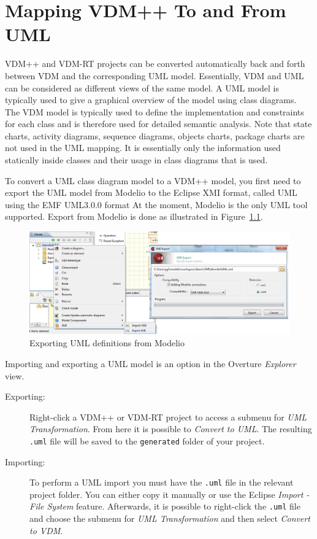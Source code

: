 \documentclass{overturerepchap}
\begin{document}
\chapter{Mapping VDM++ To and From UML}\label{sec:vdmuml}

VDM++ and VDM-RT projects can be converted automatically back and forth between
VDM and the corresponding UML model.  Essentially, VDM and UML can be
considered as different views of the same model. A UML model is typically used
to give a graphical overview of the model using class diagrams.  The VDM model
is typically used to define the implementation and constraints for each class
and is therefore used for detailed semantic analysis. Note that state charts,
activity diagrams, sequence diagrams, objects charts, package charts are not
used in the UML mapping. It is essentially only the information
used statically inside classes and their usage in class diagrams that is used.

To convert a UML class diagram model to a VDM++ model, you first need to export
the UML model from Modelio to the Eclipse XMI format, called UML
using the EMF UML3.0.0 format At the moment, Modelio is the only
UML tool supported. Export from Modelio is done as illustrated in
Figure~\ref{fig:exportfromUML}.

\begin{figure}[htbp]
\begin{center}
\includegraphics[width=4.5in]{screenDumps/xmiexportmodelio}
\caption{Exporting UML definitions from Modelio\label{fig:exportfromUML}}
\end{center}
\end{figure}

Importing and exporting a UML model is
an option in the Overture \emph{Explorer} view.
\begin{description}
    \item[Exporting:] Right-click a VDM++ or VDM-RT project to access a submenu
        for \emph{UML Transformation}. From here it is possible to
        \emph{Convert to UML}. The resulting \texttt{.uml} 
        file will be saved to the \texttt{generated} folder of your project.
    
    \item[Importing:] To perform a UML import you must have the \texttt{.uml} 
        file in the relevant project folder. You can either copy it manually or
        use the Eclipse \emph{Import - File System} feature. Afterwards, it
        is possible to right-click the \texttt{.uml} file and choose the
        submenu for \emph{UML Transformation} and
        then select \emph{Convert to VDM}. 

\end{description}
\end{document}

